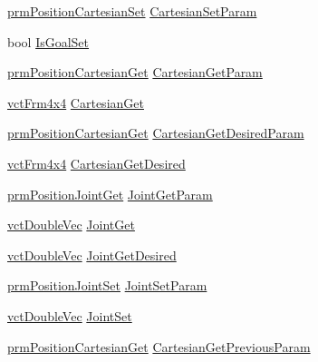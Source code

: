 \begin{DoxyCompactItemize}
\begin{tabbing}
\end{tabbing}\item 
\hyperlink{classprm_position_cartesian_set}{prm\+Position\+Cartesian\+Set} \hyperlink{classmts_intuitive_research_kit_arm_aac57cf7ee853a7eb49c166d2b466355d}{Cartesian\+Set\+Param}
\item 
bool \hyperlink{classmts_intuitive_research_kit_arm_a195a5e42ec222e5315017bc97092079a}{Is\+Goal\+Set}
\item 
\hyperlink{classprm_position_cartesian_get}{prm\+Position\+Cartesian\+Get} \hyperlink{classmts_intuitive_research_kit_arm_aaa7f1d15ec9a20f8ed317d8139561dd7}{Cartesian\+Get\+Param}
\item 
\hyperlink{vct_transformation_types_8h_a33da47f4deb2556b37a69a2c44b29d75}{vct\+Frm4x4} \hyperlink{classmts_intuitive_research_kit_arm_a1d55346b0a151a2cb1620f073dbcc574}{Cartesian\+Get}
\item 
\hyperlink{classprm_position_cartesian_get}{prm\+Position\+Cartesian\+Get} \hyperlink{classmts_intuitive_research_kit_arm_a6b37fa3ae133f7fd9b281f4f37d55625}{Cartesian\+Get\+Desired\+Param}
\item 
\hyperlink{vct_transformation_types_8h_a33da47f4deb2556b37a69a2c44b29d75}{vct\+Frm4x4} \hyperlink{classmts_intuitive_research_kit_arm_ab05e2c95fcc34a1471801b6fa052c103}{Cartesian\+Get\+Desired}
\item 
\hyperlink{classprm_position_joint_get}{prm\+Position\+Joint\+Get} \hyperlink{classmts_intuitive_research_kit_arm_ae80cfd241b7a82e0f0f7861096c98a90}{Joint\+Get\+Param}
\item 
\hyperlink{vct_dynamic_vector_types_8h_ade4b3068c86fb88f41af2e5187e491c2}{vct\+Double\+Vec} \hyperlink{classmts_intuitive_research_kit_arm_a6e083406ccebe49d0a6f7991a3f227ca}{Joint\+Get}
\item 
\hyperlink{vct_dynamic_vector_types_8h_ade4b3068c86fb88f41af2e5187e491c2}{vct\+Double\+Vec} \hyperlink{classmts_intuitive_research_kit_arm_a422d2173d1932addd901900c61b1dd11}{Joint\+Get\+Desired}
\item 
\hyperlink{classprm_position_joint_set}{prm\+Position\+Joint\+Set} \hyperlink{classmts_intuitive_research_kit_arm_aa0702f82bb6fd659326d49cec3e37c25}{Joint\+Set\+Param}
\item 
\hyperlink{vct_dynamic_vector_types_8h_ade4b3068c86fb88f41af2e5187e491c2}{vct\+Double\+Vec} \hyperlink{classmts_intuitive_research_kit_arm_a944bbb1f8a925a9c6d2e4cee2ef5ae54}{Joint\+Set}
\item 
\hyperlink{classprm_position_cartesian_get}{prm\+Position\+Cartesian\+Get} \hyperlink{classmts_intuitive_research_kit_arm_a76916616528db5cf1a5f564f006699f9}{Cartesian\+Get\+Previous\+Param}

\end{DoxyCompactItemize}
